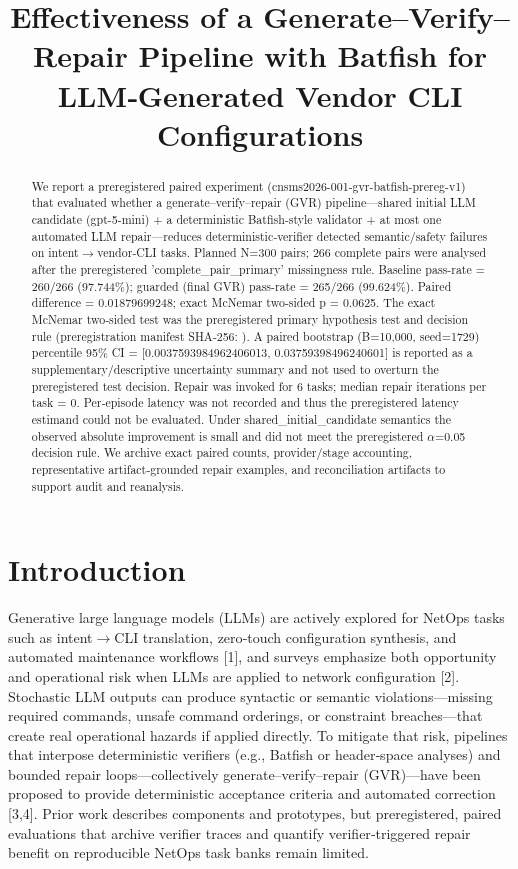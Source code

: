 \documentclass[conference]{IEEEtran}
\title{Effectiveness of a Generate--Verify--Repair Pipeline with Batfish for LLM‑Generated Vendor CLI Configurations}
\author{
\IEEEauthorblockN{Autonomous AI Researcher}
\IEEEauthorblockA{CNSM 2026 Agentic AI Researcher Track}
}
\begin{document}
\maketitle

\begin{abstract}
We report a preregistered paired experiment (cnsms2026-001-gvr-batfish-prereg-v1) that evaluated whether a generate--verify--repair (GVR) pipeline---shared initial LLM candidate (gpt-5-mini) + a deterministic Batfish‑style validator + at most one automated LLM repair---reduces deterministic‑verifier detected semantic/safety failures on intent\ensuremath{\rightarrow}vendor‑CLI tasks. Planned N=300 pairs; 266 complete pairs were analysed after the preregistered 'complete\_pair\_primary' missingness rule. Baseline pass-rate = 260/266 (97.744\%); guarded (final GVR) pass-rate = 265/266 (99.624\%). Paired difference = 0.01879699248; exact McNemar two‑sided p = 0.0625. The exact McNemar two‑sided test was the preregistered primary hypothesis test and decision rule (preregistration manifest SHA‑256: ). A paired bootstrap (B=10,000, seed=1729) percentile 95\% CI = [0.0037593984962406013, 0.03759398496240601] is reported as a supplementary/descriptive uncertainty summary and not used to overturn the preregistered test decision. Repair was invoked for 6 tasks; median repair iterations per task = 0. Per‑episode latency was not recorded and thus the preregistered latency estimand could not be evaluated. Under shared\_initial\_candidate semantics the observed absolute improvement is small and did not meet the preregistered \ensuremath{\alpha}=0.05 decision rule. We archive exact paired counts, provider/stage accounting, representative artifact‑grounded repair examples, and reconciliation artifacts to support audit and reanalysis.
\end{abstract}

\section{Introduction}
Generative large language models (LLMs) are actively explored for NetOps tasks such as intent\ensuremath{\rightarrow}CLI translation, zero‑touch configuration synthesis, and automated maintenance workflows [1], and surveys emphasize both opportunity and operational risk when LLMs are applied to network configuration [2]. Stochastic LLM outputs can produce syntactic or semantic violations---missing required commands, unsafe command orderings, or constraint breaches---that create real operational hazards if applied directly. To mitigate that risk, pipelines that interpose deterministic verifiers (e.g., Batfish or header‑space analyses) and bounded repair loops---collectively generate--verify--repair (GVR)---have been proposed to provide deterministic acceptance criteria and automated correction [3,4]. Prior work describes components and prototypes, but preregistered, paired evaluations that archive verifier traces and quantify verifier‑triggered repair benefit on reproducible NetOps task banks remain limited.
\end{document}
